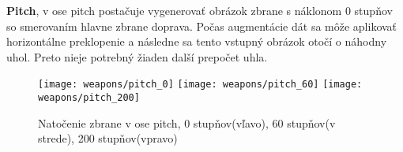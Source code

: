 \textbf{Pitch}, v ose pitch postačuje vygenerovať obrázok zbrane s náklonom 0 stupňov so smerovaním hlavne zbrane doprava.
Počas augmentácie dát sa môže aplikovať horizontálne preklopenie a následne sa tento vstupný obrázok otočí o náhodny uhol.
Preto nieje potrebný žiaden další prepočet uhla.

\begin{figure}[H]
    \centering
    \texttt{[image: weapons/pitch\_0]}
    \quad
    \texttt{[image: weapons/pitch\_60]}
    \quad
    \texttt{[image: weapons/pitch\_200]}
    \caption{Natočenie zbrane v ose pitch, 0 stupňov(vľavo), 60 stupňov(v strede), 200 stupňov(vpravo)}
    \label{pic:yawrotation}
\end{figure}
